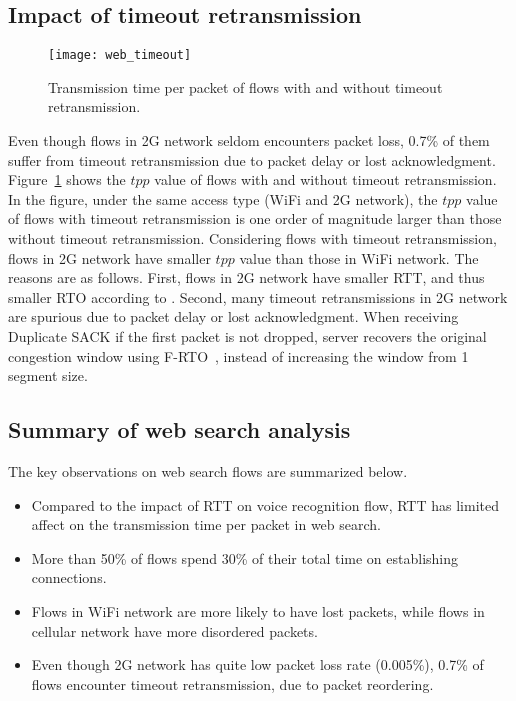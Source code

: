 \subsection{Impact of timeout retransmission}

\begin{figure}[th]
\centering
	\texttt{[image: web\_timeout]}
\caption{Transmission time per packet of flows with and without timeout retransmission.}
\label{fig:web_timeout}
\end{figure}

Even though flows in 2G network seldom encounters packet loss, 0.7\% of them suffer from timeout retransmission due to packet delay or lost acknowledgment. Figure~\ref{fig:web_timeout} shows the $tpp$ value of flows with and without timeout retransmission. In the figure, under the same access type (WiFi and 2G network), the $tpp$ value of flows with timeout retransmission is one order of magnitude larger than those without timeout retransmission. Considering flows with timeout retransmission, flows in 2G network have smaller $tpp$ value than those in WiFi network. The reasons are as follows. First, flows in 2G network have smaller RTT, and thus smaller RTO according to \cite{rfc62982011computing}. Second, many timeout retransmissions in 2G network are spurious due to packet delay or lost acknowledgment. When receiving Duplicate SACK if the first packet is not dropped, server recovers the original congestion window using F-RTO~\cite{sarolahti2005forward}, instead of increasing the window from 1 segment size.


\subsection{Summary of web search analysis}

The key observations on web search flows are summarized below.

\begin{itemize}
	\item Compared to the impact of RTT on voice recognition flow, RTT has limited affect on the transmission time per packet in web search.
	\item More than 50\% of flows spend 30\% of their total time on establishing connections.
	\item Flows in WiFi network are more likely to have lost packets, while flows in cellular network have more disordered packets.
	\item Even though 2G network has quite low packet loss rate (0.005\%), 0.7\% of flows encounter timeout retransmission, due to packet reordering.
\end{itemize}
